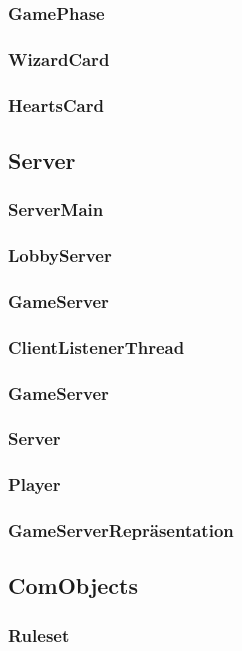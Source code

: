 \documentclass{article}
\begin{document}
\subsubsection{GamePhase}
\subsubsection{WizardCard}
\subsubsection{HeartsCard}
\newpage

\subsection{Server}
\subsubsection{ServerMain}
\subsubsection{LobbyServer}
\subsubsection{GameServer}
\subsubsection{ClientListenerThread}
\subsubsection{GameServer}
\subsubsection{Server}
\subsubsection{Player}
\subsubsection{GameServerRepräsentation}
\newpage

\subsection{ComObjects}
\subsubsection{Ruleset}
\end{document}
